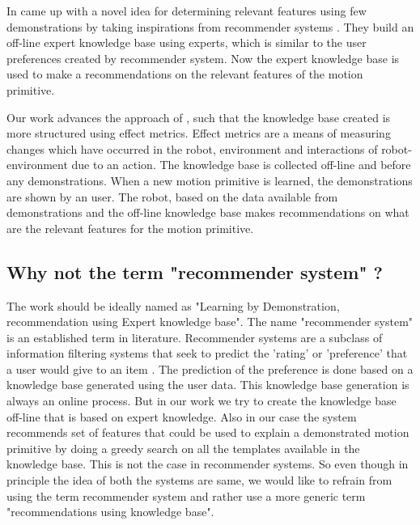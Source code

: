 In \cite{abdo_inferring_2014} came up with a novel idea for determining
relevant features using few demonstrations by taking inspirations from
recommender systems . They build an off-line expert knowledge base using
experts, which is similar to the user preferences created by recommender
system. Now the expert knowledge base is used to make a recommendations on the
relevant features of the motion primitive.


Our work advances the approach of \cite{abdo_inferring_2014}, such that the
knowledge base created is more structured using effect metrics. Effect metrics
are a means of measuring changes which have occurred in the robot, environment
and interactions of robot-environment due to an action.  The knowledge base is
collected off-line and before any demonstrations. When a new motion primitive
is learned, the demonstrations are shown by an user. The robot, based on the
data available from demonstrations and the off-line knowledge base makes
recommendations on what are the relevant features for the motion primitive.


\subsection{Why not the term "recommender system" ?}
The work should be ideally named as "Learning by Demonstration, recommendation
using Expert knowledge base". The name "recommender system" is an established
term in literature. Recommender systems are a subclass of information filtering
systems that seek to predict the 'rating' or 'preference' that a user would
give to an item \cite{bobadilla_recommender_2013}. The prediction of the
preference is done based on a knowledge base generated using the user data.
This knowledge base generation is always an online process. But in our work we
try to create the knowledge base off-line that is based on expert knowledge.
Also in our case the system recommends set of features that could be used to
explain a demonstrated motion primitive by doing a greedy search on all the
templates available in the knowledge base. This is not the case in recommender
systems. So even though in principle the idea of both the systems are same, we
would like to refrain from using the term recommender system and rather use a
more generic term "recommendations using knowledge base".
